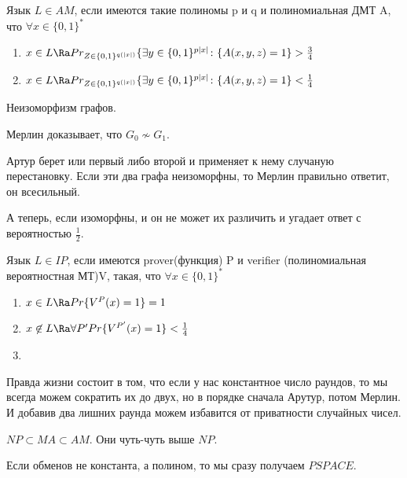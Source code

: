 \begin{Def}
Язык $L \in AM$, если имеются такие полиномы p и q и 
полиномиальная ДМТ A, что $\forall x \in \{0, 1\}^*$\\
\begin{enumerate}
\item $x \in L \Ra Pr_{Z \in \{0, 1\}^{q(|x|)}} \{\exists y \in \{0, 1\}^{p|x|} \colon  \{A(x, y, z) = 1\} > \frac{3}{4}$ \\
\item $x \in L \Ra Pr_{Z \in \{0, 1\}^{q(|x|)}} \{\exists y \in \{0, 1\}^{p|x|} \colon  \{A(x, y, z) = 1\} < \frac{1}{4}$ \\
\end{enumerate}

\end{Def}

\begin{exmp}
Неизоморфизм графов.

Мерлин доказывает, что $G_0 \not \sim G_1$.

Артур берет или первый либо второй и применяет к нему 
случаную перестановку. Если эти два графа неизоморфны, 
то Мерлин правильно ответит, он всесильный. 

А теперь, если изоморфны, и он не может их 
различить и угадает ответ с вероятностью $\frac{1}{2}$. 
\end{exmp}

\begin{Def}
Язык $L \in IP$, если имеются prover(функция) P и verifier 
(полиномиальная вероятностная МТ)V, такая, что $\forall x \in \{0, 1\}^{*}$\\
\begin{enumerate}
\item 
$x \in L \Ra Pr\{V^{P}(x) = 1\} = 1$\\
\item 
$x \not \in L \Ra \forall P' Pr\{V^{P'}(x) = 1\} < \frac{1}{4}$\\
\item 
\end{enumerate}
\end{Def}


Правда жизни состоит в том, что если у нас константное число 
раундов, то мы всегда можем сократить их до 
двух, но в порядке сначала Арутур, потом Мерлин. И добавив два лишних
раунда можем избавится от приватности случайных чисел. 

$NP \subset MA \subset AM$. Они чуть-чуть выше $NP$.

Если обменов не константа, а полином, то мы сразу получаем $PSPACE$.